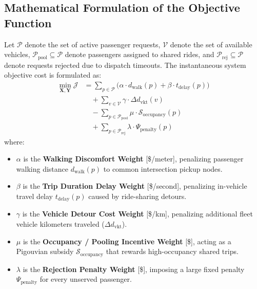\documentclass[11pt,a4paper]{article}
\begin{document}
\subsection{Mathematical Formulation of the Objective Function}
Let $\mathcal{P}$ denote the set of active passenger requests, $\mathcal{V}$ denote the set of available vehicles, $\mathcal{P}_{\text{pool}} \subseteq \mathcal{P}$ denote passengers assigned to shared rides, and $\mathcal{P}_{\text{rej}} \subseteq \mathcal{P}$ denote requests rejected due to dispatch timeouts. The instantaneous system objective cost is formulated as:
\begin{equation}
\begin{aligned}
\min_{\mathbf{X}, \mathbf{Y}} \mathcal{J} &= \sum_{p \in \mathcal{P}} \Big( \alpha \cdot d_{\text{walk}}(p) + \beta \cdot t_{\text{delay}}(p) \Big) \\
&\quad + \sum_{v \in \mathcal{V}} \gamma \cdot \Delta d_{\text{vkt}}(v) \\
&\quad - \sum_{p \in \mathcal{P}_{\text{pool}}} \mu \cdot \mathcal{S}_{\text{occupancy}}(p) \\
&\quad + \sum_{p \in \mathcal{P}_{\text{rej}}} \lambda \cdot \Psi_{\text{penalty}}(p)
\end{aligned}
\label{eq:objective}
\end{equation}
where:
\begin{itemize}
    \item $\alpha$ is the \textbf{Walking Discomfort Weight} [\$/meter], penalizing passenger walking distance $d_{\text{walk}}(p)$ to common intersection pickup nodes.
    \item $\beta$ is the \textbf{Trip Duration Delay Weight} [\$/second], penalizing in-vehicle travel delay $t_{\text{delay}}(p)$ caused by ride-sharing detours.
    \item $\gamma$ is the \textbf{Vehicle Detour Cost Weight} [\$/km], penalizing additional fleet vehicle kilometers traveled ($\Delta d_{\text{vkt}}$).
    \item $\mu$ is the \textbf{Occupancy / Pooling Incentive Weight} [\$], acting as a Pigouvian subsidy $\mathcal{S}_{\text{occupancy}}$ that rewards high-occupancy shared trips.
    \item $\lambda$ is the \textbf{Rejection Penalty Weight} [\$], imposing a large fixed penalty $\Psi_{\text{penalty}}$ for every unserved passenger.
\end{itemize}
\end{document}
